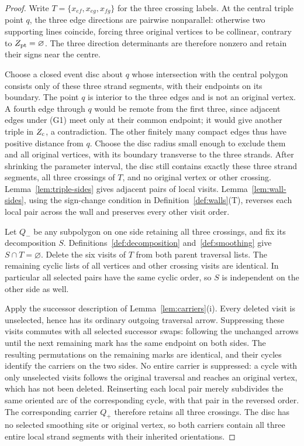 \begin{proof}
Write $T=\{x_{ef},x_{eg},x_{fg}\}$ for the three crossing labels.
At the central triple point $q$, the three edge directions are
pairwise nonparallel: otherwise two supporting lines coincide,
forcing three original vertices to be collinear, contrary to
$Z_{\rm pt}=\varnothing$.
The three direction determinants are therefore nonzero and retain
their signs near the centre.

Choose a closed event disc about $q$ whose intersection with the
central polygon consists only of these three strand segments, with
their endpoints on its boundary. The point $q$ is interior to the
three edges and is not an original vertex. A fourth edge through
$q$ would be remote from the first three, since adjacent edges under
(G1) meet only at their common endpoint; it would give another
triple in $Z_{\rm c}$, a contradiction. The other finitely many
compact edges thus have positive distance from $q$.
Choose the disc radius small enough to exclude them and all original
vertices, with its boundary transverse to the three strands.
After shrinking the parameter interval, the disc still contains
exactly these three strand segments, all three crossings of $T$,
and no original vertex or other crossing.
Lemma~\ref{lem:triple-sides} gives adjacent pairs of local visits.
Lemma~\ref{lem:wall-sides}, using the sign-change condition in
Definition~\ref{def:walls}(T), reverses each local pair across
the wall and preserves every other visit order.

Let $Q_-$ be any subpolygon on one side retaining all three
crossings, and fix its decomposition $S$.
Definitions~\ref{def:decomposition} and~\ref{def:smoothing}
give $S\cap T=\varnothing$.
Delete the six visits of $T$ from both parent traversal lists.
The remaining cyclic lists of all vertices and other crossing visits
are identical. In particular all selected pairs have the same cyclic
order, so $S$ is independent on the other side as well.

Apply the successor description of Lemma~\ref{lem:carriers}(i).
Every deleted visit is unselected, hence has its ordinary outgoing
traversal arrow. Suppressing these visits commutes with all selected
successor swaps: following the unchanged arrows until the next
remaining mark has the same endpoint on both sides.
The resulting permutations on the remaining marks are identical,
and their cycles identify the carriers on the two sides.
No entire carrier is suppressed: a cycle with only unselected
visits follows the original traversal and reaches an original vertex,
which has not been deleted.
Reinserting each local pair merely subdivides the same oriented arc
of the corresponding cycle, with that pair in the reversed order.
The corresponding carrier $Q_+$ therefore retains all three
crossings. The disc has no selected smoothing site or original
vertex, so both carriers contain all three entire local strand
segments with their inherited orientations.


\end{proof}
